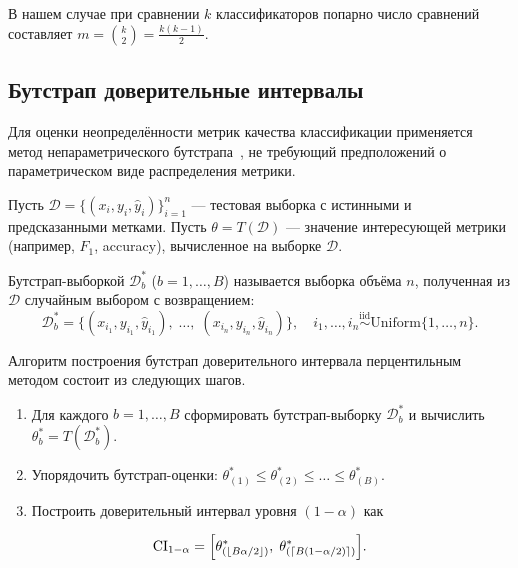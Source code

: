 В нашем случае при сравнении $k$ классификаторов попарно число
сравнений составляет $m = \binom{k}{2} = \frac{k(k-1)}{2}$.


\subsection{Бутстрап доверительные интервалы}
\label{subsec:bootstrap}

Для оценки неопределённости метрик качества классификации применяется
метод непараметрического бутстрапа~\cite{efron1979bootstrap}, не
требующий предположений о параметрическом виде распределения метрики.

Пусть $\mathcal{D} = \{(x_i, y_i, \hat{y}_i)\}_{i=1}^{n}$ ---
тестовая выборка с истинными и предсказанными метками. Пусть
$\theta = T(\mathcal{D})$ --- значение интересующей метрики
(например, $F_1$, accuracy), вычисленное на выборке $\mathcal{D}$.

\begin{definition}
\label{def:bootstrap-sample}
Бутстрап-выборкой $\mathcal{D}^{*}_b$ ($b = 1, \ldots, B$) называется
выборка объёма $n$, полученная из $\mathcal{D}$ случайным выбором с
возвращением:
\begin{equation}
    \mathcal{D}^{*}_b = \bigl\{(x_{i_1}, y_{i_1}, \hat{y}_{i_1}),\;
    \ldots,\; (x_{i_n}, y_{i_n}, \hat{y}_{i_n})\bigr\},
    \quad i_1, \ldots, i_n \stackrel{\mathrm{iid}}{\sim}
    \mathrm{Uniform}\{1, \ldots, n\}.
    \label{eq:bootstrap-sample}
\end{equation}
\end{definition}

Алгоритм построения бутстрап доверительного интервала перцентильным
методом состоит из следующих шагов.

\begin{enumerate}
    \item Для каждого $b = 1, \ldots, B$ сформировать бутстрап-выборку
          $\mathcal{D}^{*}_b$ и вычислить
          $\theta^{*}_b = T(\mathcal{D}^{*}_b)$.
    \item Упорядочить бутстрап-оценки:
          $\theta^{*}_{(1)} \leqslant \theta^{*}_{(2)} \leqslant \ldots
          \leqslant \theta^{*}_{(B)}$.
    \item Построить доверительный интервал уровня $(1-\alpha)$ как
\end{enumerate}
\begin{equation}
    \mathrm{CI}_{1-\alpha} = \Bigl[\theta^{*}_{(\lfloor B\alpha/2 \rfloor)},\;
    \theta^{*}_{(\lceil B(1-\alpha/2) \rceil)}\Bigr].
    \label{eq:bootstrap-ci}
\end{equation}

